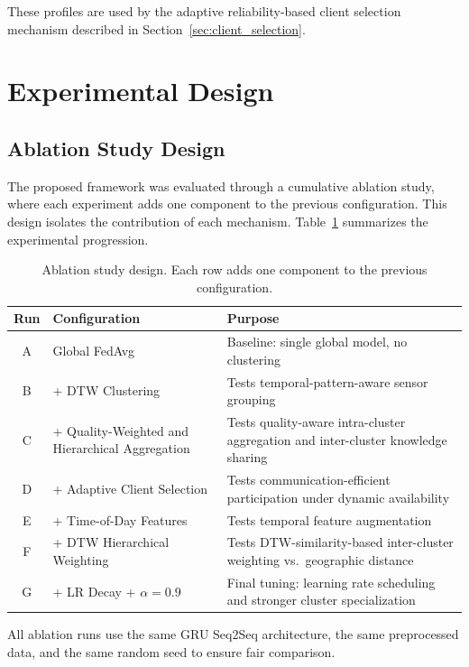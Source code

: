 These profiles are used by the adaptive reliability-based client selection mechanism described in Section~\ref{sec:client_selection}.

\section{Experimental Design}
\label{sec:exp_design}

\subsection{Ablation Study Design}

The proposed framework was evaluated through a cumulative ablation study, where each experiment adds one component to the previous configuration. This design isolates the contribution of each mechanism. Table~\ref{tab:ablation_design} summarizes the experimental progression.

\begin{table}[H]
\centering
\caption{Ablation study design. Each row adds one component to the previous configuration.}
\label{tab:ablation_design}
\small
\begin{tabular}{c p{} p{}}
\hline
\textbf{Run} & \textbf{Configuration} & \textbf{Purpose} \\
\hline
A & Global FedAvg & Baseline: single global model, no clustering \\
B & + DTW Clustering & Tests temporal-pattern-aware sensor grouping \\
C & + Quality-Weighted and Hierarchical Aggregation & Tests quality-aware intra-cluster aggregation and inter-cluster knowledge sharing \\
D & + Adaptive Client Selection & Tests communication-efficient participation under dynamic availability \\
E & + Time-of-Day Features & Tests temporal feature augmentation \\
F & + DTW Hierarchical Weighting & Tests DTW-similarity-based inter-cluster weighting vs.\ geographic distance \\
G & + LR Decay + $\alpha=0.9$ & Final tuning: learning rate scheduling and stronger cluster specialization \\
\hline
\end{tabular}
\end{table}

All ablation runs use the same GRU Seq2Seq architecture, the same preprocessed data, and the same random seed to ensure fair comparison.

